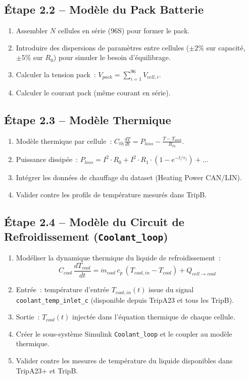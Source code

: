 \documentclass[a4paper,12pt]{article}
\begin{document}
\subsection{Étape 2.2 -- Modèle du Pack Batterie}
\begin{enumerate}[nosep]
  \item Assembler $N$ cellules en série (96S) pour former le pack.
  \item Introduire des dispersions de paramètres entre cellules ($\pm 2\%$ sur capacité, $\pm 5\%$ sur $R_0$) pour simuler le besoin d'équilibrage.
  \item Calculer la tension pack~: $V_{pack} = \sum_{i=1}^{96} V_{cell,i}$.
  \item Calculer le courant pack (même courant en série).
\end{enumerate}

\subsection{Étape 2.3 -- Modèle Thermique}
\begin{enumerate}[nosep]
  \item Modèle thermique par cellule~: $C_{th} \frac{dT}{dt} = P_{loss} - \frac{T - T_{amb}}{R_{th}}$.
  \item Puissance dissipée~: $P_{loss} = I^2 \cdot R_0 + I^2 \cdot R_1 \cdot (1 - e^{-t/\tau_1}) + \ldots$
  \item Intégrer les données de chauffage du dataset (Heating Power CAN/LIN).
  \item Valider contre les profils de température mesurés dans TripB.
\end{enumerate}

\subsection{Étape 2.4 -- Modèle du Circuit de Refroidissement (\texttt{Coolant\_loop})}
\begin{enumerate}[nosep]
  \item Modéliser la dynamique thermique du liquide de refroidissement~:
    \[ C_{cool}\,\frac{dT_{cool}}{dt} = \dot{m}_{cool}\,c_p\,(T_{cool,in} - T_{cool}) + Q_{cell \to cool} \]
  \item Entrée~: température d'entrée $T_{cool,in}(t)$ issue du signal \texttt{coolant\_temp\_inlet\_c} (disponible depuis TripA23 et tous les TripB).
  \item Sortie~: $T_{cool}(t)$ injectée dans l'équation thermique de chaque cellule.
  \item Créer le sous-système Simulink \texttt{Coolant\_loop} et le coupler au modèle thermique.
  \item Valider contre les mesures de température du liquide disponibles dans TripA23+ et TripB.
\end{enumerate}
\end{document}
